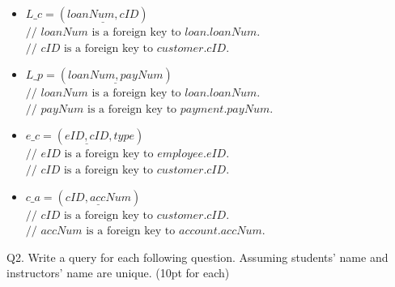 \documentclass{article}
\begin{document}
\begin{itemize}
	\item \(L\_c = (\underline{loanNum, cID})\) \\
	\(\text{// } loanNum \text{ is a foreign key to } loan.loanNum\). \\
	\(\text{// } cID \text{ is a foreign key to } customer.cID\).
\end{itemize}

\begin{itemize}
	\item \(L\_p = (\underline{loanNum, payNum})\) \\
	\(\text{// } loanNum \text{ is a foreign key to } loan.loanNum\). \\
	\(\text{// } payNum \text{ is a foreign key to } payment.payNum\).
\end{itemize}

\begin{itemize}
	\item \(e\_c = (\underline{eID, cID}, type)\) \\
	\(\text{// } eID \text{ is a foreign key to } employee.eID\). \\
	\(\text{// } cID \text{ is a foreign key to } customer.cID\).
\end{itemize}


\begin{itemize}
	\item \(c\_a = (\underline{cID, accNum})\) \\
	\(\text{// } cID \text{ is a foreign key to } customer.cID\). \\
	\(\text{// } accNum \text{ is a foreign key to } account.accNum\).
\end{itemize}



Q2. Write a query for each following question. Assuming students' name
and instructors' name are unique. (10pt for each)
\end{document}
